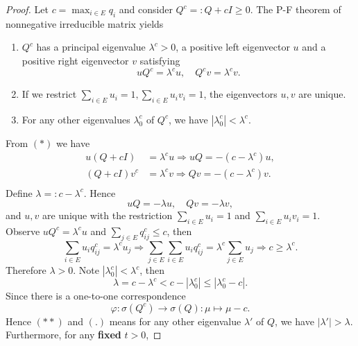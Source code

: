 \documentclass[12pt]{article}
\renewcommand{\(}{\left(}%
\renewcommand{\)}{\right)}%
\renewcommand{\[}{\left[}%
\renewcommand{\]}{\right]}%
\newtheorem{proof}{Proof.}}
\begin{document}
  \begin{proof}
    Let $c=\max_{i\in E}q_i$ and consider $Q^c=:Q+cI\geq 0$. The P-F theorem of nonnegative irreducible matrix yields
    \begin{enumerate}
     \item $Q^c$ has a principal eigenvalue $\lambda^c> 0$, a positive left eigenvector $u$ and a positive right eigenvector $v$ satisfying
     \begin{equation*}
      uQ^c=\lambda^cu,\quad Q^cv=\lambda^cv.\tag{$*$}
     \end{equation*}
     \item If we restrict $\sum_{i\in E}u_i=1,\sum_{i\in E}u_iv_i=1$, the eigenvectors $u,v$ are unique.
     \item For any other eigenvalues $\lambda^c_0$ of $Q^c$, we have $|\lambda^c_0 |< \lambda^c$.
    \end{enumerate}
    From $(*)$ we have
    \begin{equation*}
     \begin{split}
      u\(Q+cI\)&=\lambda^cu\Longrightarrow uQ=-(c-\lambda^c)u, \\
      \(Q+cI\)v^c&=\lambda^cv\Longrightarrow Qv=-(c-\lambda^c)v. \\
     \end{split}
    \end{equation*}
    Define $\lambda=:c-\lambda^c$. Hence
    \begin{equation*}
     uQ=-\lambda u,\quad Qv=-\lambda v,
    \end{equation*}
    and $u,v$ are unique with the restriction $\sum_{i\in E}u_i=1$ and $\sum_{i\in E}u_iv_i=1$.
    Observe $uQ^c=\lambda^cu$ and $\sum_{j\in E}q^c_{ij}\leq c$, then
    \begin{equation*}
     \sum_{i\in E}u_{i}q^c_{ij}=\lambda^cu_j\Rightarrow\sum_{j\in E}\sum_{i\in E}u_{i}q^c_{ij}=\lambda^c\sum_{j\in E}u_j\Rightarrow c\geq\lambda^c.
    \end{equation*}
    Therefore $\lambda>0$. Note $|\lambda_0^c|<\lambda^c$, then
    \begin{equation*}
     \lambda= c-\lambda^c<c-|\lambda_0^c |\leq |\lambda_0^c-c |.\tag{$**$}
    \end{equation*}
    Since there is a one-to-one correspondence
    \begin{equation*}
     \varphi: \sigma\(Q^c\)\to\sigma\(Q\): \mu\mapsto\mu-c.\tag{$.$}
    \end{equation*}
    Hence $(**)$ and $(.)$ means for any other eigenvalue $\lambda'$ of $Q$, we have $|\lambda' |>\lambda$. Furthermore, for any {\bfseries fixed} $t>0$,

\end{proof}
\end{document}
